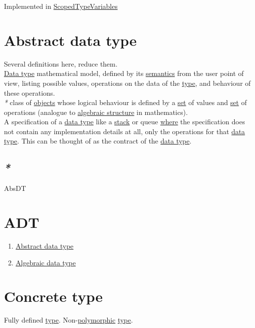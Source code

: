 \documentclass[a4paper,14pt,oneside]{book}
\begin{document}
Implemented in \hyperref[org72c1aec]{ScopedTypeVariables}\\

\chapter{\label{org677ad15}Abstract data type}
\label{sec:org885f159}

Several definitions here, reduce them.\\

\hyperref[orgbde1baf]{Data type} mathematical model, defined by its \hyperref[org322a4b8]{semantics} from the user point of view, listing possible values, operations on the data of the \hyperref[orgd6db20c]{type}, and behaviour of these operations.\\

\emph{*} class of \hyperref[org22f7883]{objects} whose logical behaviour is defined by a \hyperref[orge119629]{set} of values and \hyperref[orge119629]{set} of operations (analogue to \hyperref[org3279da7]{algebraic structure} in mathematics).\\

A specification of a \hyperref[orgbde1baf]{data type} like a \hyperref[org65341ae]{stack} or queue \hyperref[orgd3dc8e4]{where} the specification does not contain any implementation details at all, only the operations for that \hyperref[orgbde1baf]{data type}. This can be thought of as the contract of the \hyperref[orgbde1baf]{data type}.\\

\section{\emph{*}}
\label{sec:org93e3e51}

\label{orgf36af22}AbsDT\\

\chapter{\label{org5030e5e}ADT}
\label{sec:org13d0b77}
\begin{enumerate}
\item \hyperref[org677ad15]{Abstract data type}\\
\item \hyperref[org05a048b]{Algebraic data type}\\
\end{enumerate}

\chapter{\label{org0c57258}Concrete type}
\label{sec:org31c79b0}
Fully defined \hyperref[orgd6db20c]{type}. Non-\hyperref[org0255a02]{polymorphic} \hyperref[orgd6db20c]{type}.\\
\end{document}
